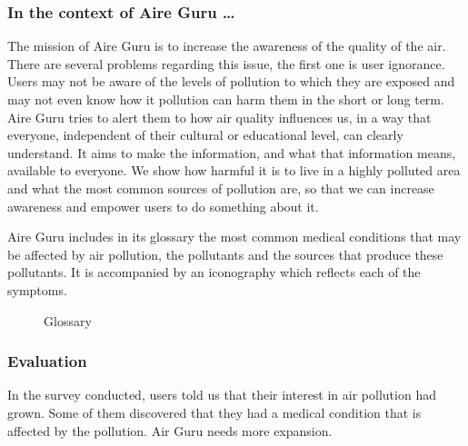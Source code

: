 \subsubsection*{In the context of Aire Guru \ldots}

The mission of Aire Guru is to increase the awareness of the quality of the air.
There are several problems regarding this issue, the first one is user ignorance. Users may not be
aware of the levels of pollution to which they are exposed and may not even know how it pollution can harm them
in the short or long term.\\

Aire Guru tries to alert them to how air quality influences us, in a way that everyone, independent of their cultural or educational level,
can clearly understand. It aims to make the information, and what that information means, available to everyone. We show how harmful it is to live in a highly polluted area and what the most common sources of pollution
are, so that we can increase awareness and empower users to do something about it.


Aire Guru includes in its glossary the most common medical conditions that may be affected by air pollution, the pollutants and the sources that produce these pollutants. It is accompanied by an iconography
which reflects each of the symptoms. \\

\begin{figure}[ht]
    \centering
    \hfill
  
  \caption{Glossary}
    \end{figure}

\subsubsection*{Evaluation}  

\begin{itemize}
    \done In the survey conducted, users told us that their interest in air pollution had grown. Some of them discovered that they had a medical condition that is affected by the pollution.
    \crossed Air Guru needs more expansion.
\end{itemize}
